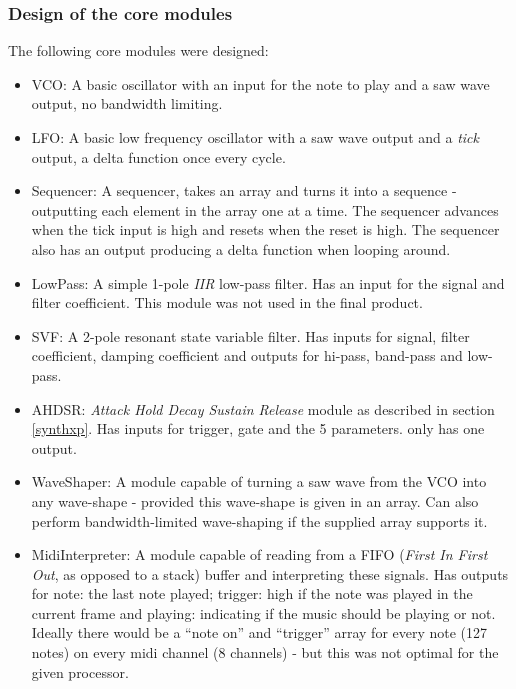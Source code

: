 \subsubsection{Design of the core modules}
The following core modules were designed:
\begin{itemize}
  \item VCO: A basic oscillator with an input for the note to play and a saw
  wave output, no bandwidth limiting.
  \item LFO: A basic low frequency oscillator with a saw wave output and a
  \emph{tick} output, a delta function once every cycle.
  \item Sequencer: A sequencer, takes an array and turns it into a sequence -
  outputting each element in the array one at a time. The sequencer advances
  when the tick input is high and resets when the reset is high. The sequencer
  also has an output producing a delta function when looping around.
  \item LowPass: A simple 1-pole \emph{IIR} low-pass filter. Has an input for
  the signal and filter coefficient. This module was not used in the final product.
  \item SVF: A 2-pole resonant state variable filter. Has inputs for signal,
  filter coefficient, damping coefficient and outputs for hi-pass, band-pass and
  low-pass.
  \item AHDSR: \emph{Attack Hold Decay Sustain Release} module as described in
  section \ref{synthxp}. Has inputs for trigger, gate and the 5 parameters. only
  has one output.
  \item WaveShaper: A module capable of turning a saw wave from the VCO into any
  wave-shape - provided this wave-shape is given in an array. Can also perform
  bandwidth-limited wave-shaping if the supplied array supports it.
  \item MidiInterpreter: A module capable of reading from a FIFO (\emph{First
  In First Out}, as opposed to a stack) buffer and interpreting these signals.
  Has outputs for note: the last note played; trigger: high if the note was
  played in the current frame and playing: indicating if the music should be
  playing or not. Ideally there would be a ``note on'' and ``trigger'' array for
  every note (127 notes) on every midi channel (8 channels) - but this was not
  optimal for the given processor.
\end{itemize}

